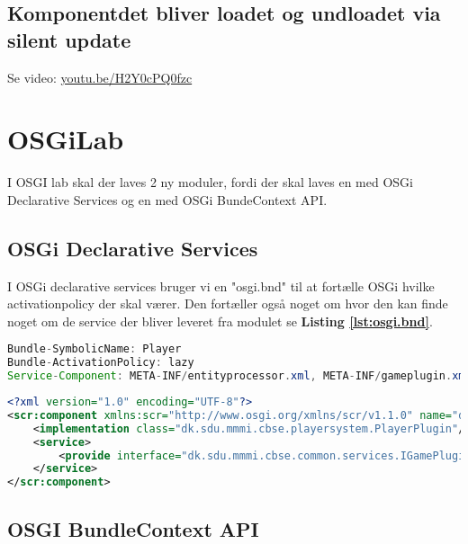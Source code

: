 \subsection{Komponentdet bliver loadet og undloadet via silent update}
Se video: \href{https://www.youtube.com/watch?v=H2Y0cPQ0fzc}{youtu.be/H2Y0cPQ0fzc}


\newpage
\section{OSGiLab}
I OSGI lab skal der laves 2 ny moduler, fordi der skal laves en med OSGi
Declarative Services og en med OSGi BundeContext API.

\subsection{OSGi Declarative Services}
I OSGi declarative services bruger vi en "osgi.bnd" til at fortælle OSGi hvilke
activationpolicy der skal værer. Den fortæller også noget om hvor den kan finde
noget om de service der bliver leveret fra modulet se \textbf{Listing
\ref{lst:osgi.bnd}}.


\begin{lstlisting}[caption={osgi.bnd}, label={lst:osgi.bnd}, language=java]
Bundle-SymbolicName: Player
Bundle-ActivationPolicy: lazy
Service-Component: META-INF/entityprocessor.xml, META-INF/gameplugin.xml
\end{lstlisting}

\begin{lstlisting}[caption={gameplugin.xml}, label={lst:gameplugin.xml}, language=xml]
<?xml version="1.0" encoding="UTF-8"?>
<scr:component xmlns:scr="http://www.osgi.org/xmlns/scr/v1.1.0" name="dk.sdu.mmmi.cbse.playersystem.plugin">
    <implementation class="dk.sdu.mmmi.cbse.playersystem.PlayerPlugin"/>
    <service>
        <provide interface="dk.sdu.mmmi.cbse.common.services.IGamePluginService"/>
    </service>
</scr:component>
\end{lstlisting}


\newpage
\subsection{OSGI BundleContext API}

